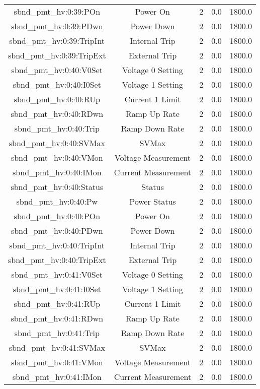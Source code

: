 \begin{center}
\begin{longtable}{c | c c c c }
sbnd\_pmt\_hv:0:39:POn & Power On & 2 & 0.0 & 1800.0\\ 
sbnd\_pmt\_hv:0:39:PDwn & Power Down & 2 & 0.0 & 1800.0\\ 
sbnd\_pmt\_hv:0:39:TripInt & Internal Trip & 2 & 0.0 & 1800.0\\ 
sbnd\_pmt\_hv:0:39:TripExt & External Trip & 2 & 0.0 & 1800.0\\ 
sbnd\_pmt\_hv:0:40:V0Set & Voltage 0 Setting & 2 & 0.0 & 1800.0\\ 
sbnd\_pmt\_hv:0:40:I0Set & Voltage 1 Setting & 2 & 0.0 & 1800.0\\ 
sbnd\_pmt\_hv:0:40:RUp & Current 1 Limit & 2 & 0.0 & 1800.0\\ 
sbnd\_pmt\_hv:0:40:RDwn & Ramp Up Rate & 2 & 0.0 & 1800.0\\ 
sbnd\_pmt\_hv:0:40:Trip & Ramp Down Rate & 2 & 0.0 & 1800.0\\ 
sbnd\_pmt\_hv:0:40:SVMax & SVMax & 2 & 0.0 & 1800.0\\ 
sbnd\_pmt\_hv:0:40:VMon & Voltage Measurement & 2 & 0.0 & 1800.0\\ 
sbnd\_pmt\_hv:0:40:IMon & Current Measurement & 2 & 0.0 & 1800.0\\ 
sbnd\_pmt\_hv:0:40:Status & Status & 2 & 0.0 & 1800.0\\ 
sbnd\_pmt\_hv:0:40:Pw & Power Status & 2 & 0.0 & 1800.0\\ 
sbnd\_pmt\_hv:0:40:POn & Power On & 2 & 0.0 & 1800.0\\ 
sbnd\_pmt\_hv:0:40:PDwn & Power Down & 2 & 0.0 & 1800.0\\ 
sbnd\_pmt\_hv:0:40:TripInt & Internal Trip & 2 & 0.0 & 1800.0\\ 
sbnd\_pmt\_hv:0:40:TripExt & External Trip & 2 & 0.0 & 1800.0\\ 
sbnd\_pmt\_hv:0:41:V0Set & Voltage 0 Setting & 2 & 0.0 & 1800.0\\ 
sbnd\_pmt\_hv:0:41:I0Set & Voltage 1 Setting & 2 & 0.0 & 1800.0\\ 
sbnd\_pmt\_hv:0:41:RUp & Current 1 Limit & 2 & 0.0 & 1800.0\\ 
sbnd\_pmt\_hv:0:41:RDwn & Ramp Up Rate & 2 & 0.0 & 1800.0\\ 
sbnd\_pmt\_hv:0:41:Trip & Ramp Down Rate & 2 & 0.0 & 1800.0\\ 
sbnd\_pmt\_hv:0:41:SVMax & SVMax & 2 & 0.0 & 1800.0\\ 
sbnd\_pmt\_hv:0:41:VMon & Voltage Measurement & 2 & 0.0 & 1800.0\\ 
sbnd\_pmt\_hv:0:41:IMon & Current Measurement & 2 & 0.0 & 1800.0\\ 

\end{longtable}
\end{center}
